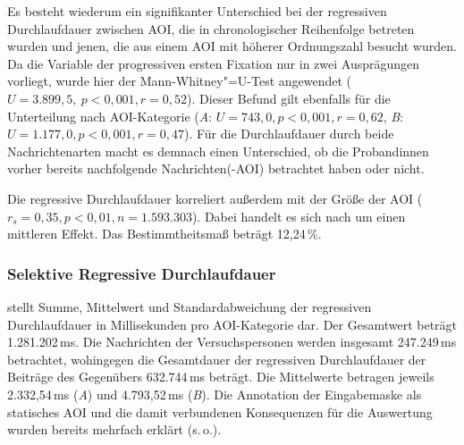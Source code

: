 Es besteht wiederum ein signifikanter Unterschied bei der regressiven Durchlaufdauer zwischen AOI, die in chronologischer Reihenfolge betreten wurden und jenen, die aus einem AOI mit höherer Ordnungszahl besucht wurden. Da die Variable der progressiven ersten Fixation nur in zwei Ausprägungen vorliegt, wurde hier der Mann-Whitney"=U-Test angewendet ($U = 3.899,5,\allowbreak\ p < 0,001,\allowbreak r = 0,52$). Dieser Befund gilt ebenfalls für die Unterteilung nach AOI-Kategorie (\emph{A}: $U = 743,0, p < 0,001, r = 0,62$, \emph{B}: $U = 1.177,0, p < 0,001, r = 0,47$). Für die Durchlaufdauer durch beide Nachrichtenarten macht es demnach einen Unterschied, ob die Proband{\textperiodcentered}innen vorher bereits nachfolgende Nachrichten(-AOI) betrachtet haben oder nicht.

Die regressive Durchlaufdauer korreliert außerdem mit der Größe der AOI ($r_{s} = 0,35, p < 0,01, n = 1.593.303$). Dabei handelt es sich nach \citet{cohen_power_1992} um einen mittleren Effekt. Das Bestimmtheitsmaß beträgt 12,24\,\%.

\subsubsection{Selektive Regressive Durchlaufdauer}
\label{K6:para:DeDe:iaselregpd}

\begin{sloppypar}
 stellt Summe, Mittelwert und Standardabweichung der regressiven Durchlaufdauer in Millisekunden pro AOI-Kategorie dar. Der Gesamtwert beträgt 1.281.202\,ms. Die Nachrichten der Versuchspersonen werden insgesamt 247.249\,ms betrachtet, wohingegen die Gesamtdauer der regressiven Durchlaufdauer der Beiträge des Gegenübers 632.744\,ms beträgt. Die Mittelwerte betragen jeweils 2.332,54\,ms (\emph{A}) und 4.793,52\,ms (\emph{B}). Die Annotation der Eingabemaske als statisches AOI und die damit verbundenen Konsequenzen für die Auswertung wurden bereits mehrfach erklärt (s.\,o.).
\end{sloppypar}

